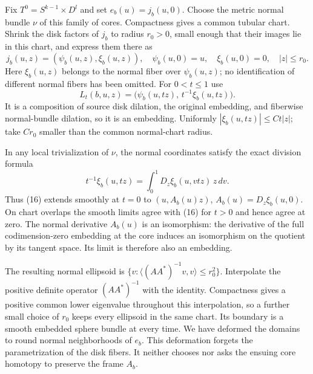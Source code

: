 \documentclass[11pt]{article}
\begin{document}
Fix \(T^0=S^{k-1}\times D^l\) and set \(e_b(u)=j_b(u,0)\).
Choose the metric normal bundle \(\nu\) of this family of cores.
Compactness gives a common tubular chart. Shrink the disk factors
of \(j_b\) to radius \(r_0>0\), small enough that their images
lie in this chart, and express them there as
\[
 j_b(u,z)=(\psi_b(u,z),\xi_b(u,z)),\quad
 \psi_b(u,0)=u,\quad \xi_b(u,0)=0,\quad |z|\leq r_0 .
 \]
Here \(\xi_b(u,z)\) belongs to the normal fiber over
\(\psi_b(u,z)\); no identification of different normal fibers has
been omitted. For \(0<t\leq1\) use
\[
 L_t(b,u,z)=\bigl(\psi_b(u,tz),\,t^{-1}\xi_b(u,tz)\bigr).
 \tag{16}
\]
It is a composition of source disk dilation, the original embedding,
and fiberwise normal-bundle dilation, so it is an embedding.
Uniformly \(|\xi_b(u,tz)|\leq Ct|z|\); take \(Cr_0\) smaller
than the common normal-chart radius.

In any local trivialization of \(\nu\), the normal coordinates satisfy
the exact division formula
\[
 t^{-1}\xi_b(u,tz)
   =\int_0^1D_z\xi_b(u,vtz)\,z\,dv .                \tag{17}
\]
Thus (16) extends smoothly at \(t=0\) to
\((u,A_b(u)z)\), \(A_b(u)=D_z\xi_b(u,0)\).
On chart overlaps the smooth limits agree with (16) for \(t>0\)
and hence agree at zero. The normal derivative \(A_b(u)\) is an
isomorphism: the derivative of the full codimension-zero embedding
at the core induces an isomorphism on the quotient by its tangent
space. Its limit is therefore also an embedding.

The resulting normal ellipsoid is
\(\{v:\langle(AA^*)^{-1}v,v\rangle\leq r_0^2\}\).
Interpolate the positive definite operator \((AA^*)^{-1}\) with
the identity. Compactness gives a positive common lower eigenvalue
throughout this interpolation, so a further small choice of \(r_0\)
keeps every ellipsoid in the same chart. Its boundary is a smooth
embedded sphere bundle at every time. We have deformed the domains
to round normal neighborhoods of \(e_b\).
This deformation forgets the parametrization of the disk fibers.
It neither chooses nor asks the ensuing core homotopy to preserve
the frame \(A_b\).
\end{document}
